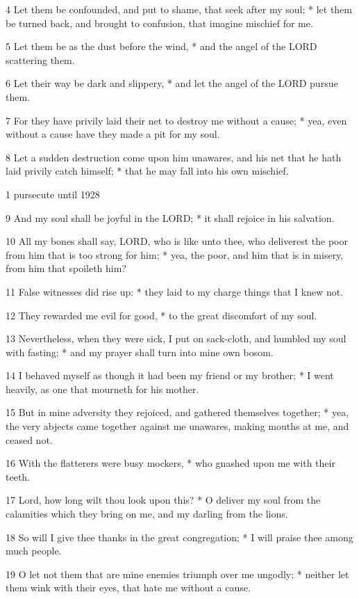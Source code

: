 4 Let them be confounded, and put to shame, that seek
after my soul; * let them be turned back, and brought to confusion, that
imagine mischief for me.

5 Let them be as the dust before the wind, * and the
angel of the LORD scattering them.

6 Let their way be dark and slippery, * and let the
angel of the LORD pursue them.

7 For they have privily laid their net to destroy me
without a cause; * yea, even without a cause have they made a pit for
my soul.

8 Let a sudden destruction come upon him unawares,
and his net that he hath laid privily catch himself; * that he may fall
into his own mischief.

1 pursecute until
1928

9 And my soul shall be joyful in the LORD;
* it shall rejoice in his salvation.

10 All my bones shall say, LORD,
who is like unto thee, who deliverest the poor from him that is too strong
for him; * yea, the poor, and him that is in misery, from him that spoileth
him?

11 False witnesses did rise up: * they laid to my charge
things that I knew not.

12 They rewarded me evil for good, * to the great discomfort
of my soul.

13 Nevertheless, when they were sick, I put on sack-cloth,
and humbled my soul with fasting; * and my prayer shall turn into mine
own bosom.

14 I behaved myself as though it had been my friend
or my brother; * I went heavily, as one that mourneth for his mother.

15 But in mine adversity they rejoiced, and gathered
themselves together; * yea, the very abjects came together against me
unawares, making mouths at me, and ceased not.

16 With the flatterers were busy mockers, * who gnashed
upon me with their teeth.

17 Lord, how long wilt thou look upon this? * O deliver
my soul from the calamities which they bring on me, and my darling from
the lions.

18 So will I give thee thanks in the great congregation;
* I will praise thee among much people.

19 O let not them that are mine enemies triumph over
me ungodly; * neither let them wink with their eyes, that hate me without
a cause.

